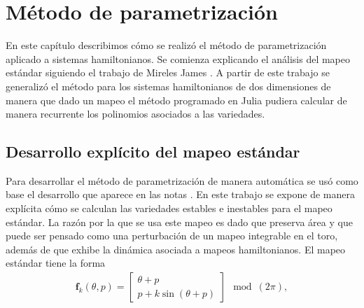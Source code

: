 
\chapter{Método de parametrización}
En este capítulo describimos cómo se realizó el método de parametrización aplicado a sistemas hamiltonianos. Se comienza explicando el análisis del mapeo estándar siguiendo el trabajo de Mireles James \cite{Mireles}. A partir de este trabajo se generalizó el método para los sistemas hamiltonianos de dos dimensiones de manera que dado un mapeo el método programado en Julia pudiera calcular de manera recurrente los polinomios asociados a las variedades.
\section{Desarrollo explícito del mapeo estándar}
Para desarrollar el método de parametrización de manera automática se usó como base el desarrollo que aparece en las notas \cite{Mireles}. En este trabajo se expone de manera explícita cómo se calculan las variedades estables e inestables para el mapeo estándar. La razón por la que se usa este mapeo es dado que preserva área y que puede ser pensado como una perturbación de un mapeo integrable en el toro, además de que exhibe la dinámica asociada a mapeos hamiltonianos. El mapeo estándar tiene la forma\\
\begin{eqnarray}
\mathbf{f}_{k}(\theta,p) = \left[\begin{array}{c}
\theta + p \\
p + k\sin(\theta +p)
\end{array}\right] \mod(2\pi),  \label{mapeo estandar}
\end{eqnarray}

